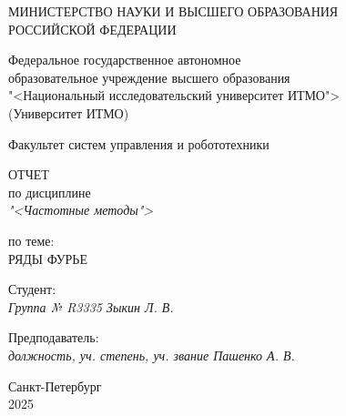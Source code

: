 \thispagestyle{empty}

\begin{center}
    МИНИСТЕРСТВО НАУКИ И ВЫСШЕГО ОБРАЗОВАНИЯ \\ РОССИЙСКОЙ ФЕДЕРАЦИИ

    \vspace{20pt}

    Федеральное государственное автономное \\ образовательное учреждение высшего образования \\
    "<Национальный исследовательский университет ИТМО"> \\
    (Университет ИТМО)

    \vspace{20pt}

    Факультет систем управления и робототехники
\end{center}

\vfill

\begin{center}
    ОТЧЕТ \\  
    по дисциплине \\
    \textit{"<Частотные методы">}

    \vspace{20pt}

    по теме: \\
    \uppercase{Ряды Фурье}
\end{center}

\vfill

    \noindent Студент: \\
    \textit{Группа № R3335 \hfill Зыкин Л. В.}

    \vspace{20pt}

    \noindent Предподаватель: \\
    \textit{должность, уч. степень, уч. звание \hfill Пашенко А. В.}

\vfill

\begin{center}
    Санкт-Петербург \\ 2025
\end{center}